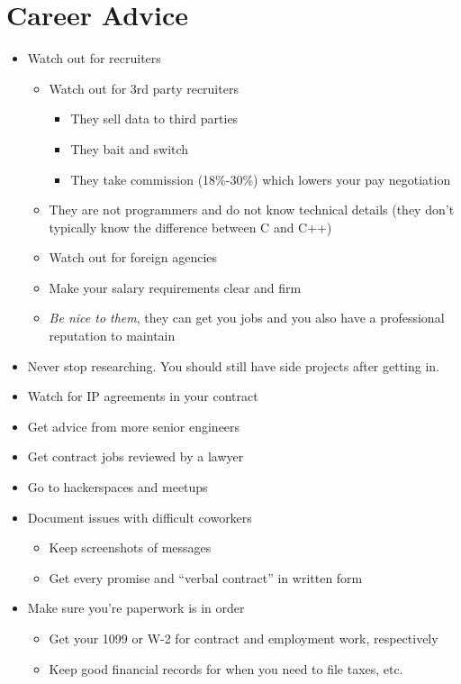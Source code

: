 \documentclass[12pt]{article}
\begin{document}
\section{Career Advice}
\begin{itemize}
\item Watch out for recruiters
  \begin{itemize}
  \item Watch out for 3rd party recruiters
    \begin{itemize}
    \item They sell data to third parties
    \item They bait and switch
    \item They take commission (18\%-30\%) which lowers your pay negotiation
    \end{itemize}
  \item They are not programmers and do not know technical details (they don't typically know the difference between C and C++)
  \item Watch out for foreign agencies
  \item Make your salary requirements clear and firm
  \item {\em Be nice to them}, they can get you jobs and you also have a professional reputation to maintain
  \end{itemize}
\item Never stop researching.  You should still have side projects after getting in.
\item Watch for IP agreements in your contract
\item Get advice from more senior engineers
\item Get contract jobs reviewed by a lawyer
\item Go to hackerspaces and meetups
\item Document issues with difficult coworkers
  \begin{itemize}
  \item Keep screenshots of messages
  \item Get every promise and ``verbal contract'' in written form
  \end{itemize}
\item Make sure you're paperwork is in order
  \begin{itemize}
  \item Get your 1099 or W-2 for contract and employment work, respectively
  \item Keep good financial records for when you need to file taxes, etc.

\end{itemize}
\end{itemize}
\end{document}
